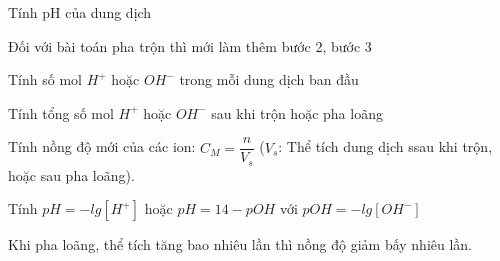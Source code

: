\begin{dang}{Tính pH của dung dịch}
\end{dang}
\begin{pp}
	Đối với bài toán pha trộn thì mới làm thêm bước 2, bước 3
	\begin{cacbuoc}
		\item Tính số mol $H^+$ hoặc $OH^-$ trong mỗi dung dịch ban đầu
		\item Tính tổng số mol $H^+$ hoặc $OH^-$ sau khi trộn hoặc pha loãng
		\item Tính nồng độ mới của các ion: $C_M=\dfrac{n}{V_s}$ ($V_s$: Thể tích dung dịch ssau khi trộn, hoặc sau pha loãng).
		\item Tính $pH=-lg[H^+]$ hoặc $pH=14-pOH$ với $pOH =-lg[OH^-]$
	\end{cacbuoc}
\end{pp}
{ Khi pha loãng, thể tích tăng bao nhiêu lần thì nồng độ giảm bấy nhiêu lần.}
\begin{center}
\end{center}
